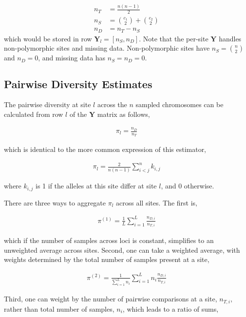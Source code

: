 \documentclass[11pt]{article}
\begin{document}
\begin{align*}
  n_T &= \frac{n(n-1)}{2} \\
  n_S &= {c_1 \choose 2} + {c_2 \choose 2} \\
  n_D &= n_T - n_S
\end{align*}
%
which would be stored in row $\mathbf{Y}_l = [n_S, n_D]$. Note that the
per-site $\mathbf{Y}$ handles non-polymorphic sites and missing data.
Non-polymorphic sites have $n_S = {n \choose 2}$ and $n_D = 0$, and missing
data has $n_S = n_D = 0$.

\subsection{Pairwise Diversity Estimates}
\label{suppsec:diversity}

The pairwise diversity at site $l$ across the $n$ sampled chromosomes can be
calculated from row $l$ of the $\mathbf{Y}$ matrix as follows,

\begin{align}
  \pi_l = \frac{n_D}{n_T}
\end{align}

which is identical to the more common expression of this estimator, 

\begin{align}
  \pi_l = \frac{2}{n(n-1)} \sum_{i < j}^n k_{i,j}
\end{align}

where $k_{i,j}$ is 1 if the alleles at this site differ at site $l$, and 0
otherwise.

There are three ways to aggregate $\pi_l$ across all sites. The first is,

\begin{align}
  \label{eq:}
  \pi^{(1)} = \frac{1}{L} \sum_{i=1}^L \frac{n_{D,i}}{n_{T,i}}
\end{align}

which if the number of samples across loci is constant, simplifies to an
unweighted average across sites. Second, one can take a weighted average, with
weights determined by the total number of samples present at a site,

\begin{align}
  \label{eq:}
  \pi^{(2)} = \frac{1}{\sum_{i=1}^L n_i} \sum_{i=1}^L n_i \frac{n_{D,i}}{n_{T,i}}
\end{align}

Third, one can weight by the number of pairwise comparisons at a site,
$n_{T,i}$, rather than total number of samples, $n_i$, which leads to a ratio
of sums,
\end{document}
